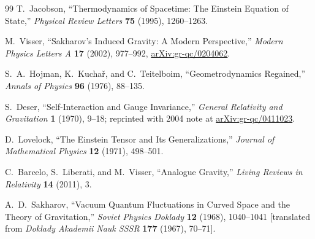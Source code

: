 \begin{thebibliography}{99}
T.~Jacobson,
``Thermodynamics of Spacetime: The Einstein Equation of State,''
\emph{Physical Review Letters} \textbf{75} (1995), 1260--1263.

M.~Visser,
``Sakharov's Induced Gravity: A Modern Perspective,''
\emph{Modern Physics Letters A} \textbf{17} (2002), 977--992,
\href{https://arxiv.org/abs/gr-qc/0204062}{arXiv:gr-qc/0204062}.

S.~A.~Hojman, K.~Kucha\v{r}, and C.~Teitelboim,
``Geometrodynamics Regained,''
\emph{Annals of Physics} \textbf{96} (1976), 88--135.

S.~Deser,
``Self-Interaction and Gauge Invariance,''
\emph{General Relativity and Gravitation} \textbf{1} (1970), 9--18;
reprinted with 2004 note at
\href{https://arxiv.org/abs/gr-qc/0411023}{arXiv:gr-qc/0411023}.

D.~Lovelock,
``The Einstein Tensor and Its Generalizations,''
\emph{Journal of Mathematical Physics} \textbf{12} (1971), 498--501.

C.~Barcelo, S.~Liberati, and M.~Visser,
``Analogue Gravity,''
\emph{Living Reviews in Relativity} \textbf{14} (2011), 3.

A.~D.~Sakharov,
``Vacuum Quantum Fluctuations in Curved Space and the Theory of Gravitation,''
\emph{Soviet Physics Doklady} \textbf{12} (1968), 1040--1041
[translated from \emph{Doklady Akademii Nauk SSSR} \textbf{177} (1967), 70--71].

\end{thebibliography}
